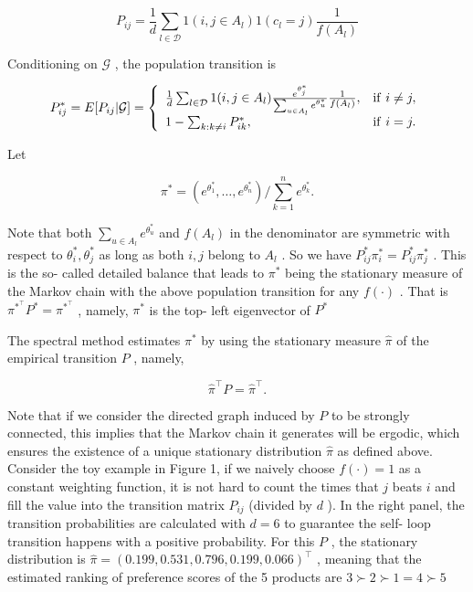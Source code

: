 \[
P_{i j} = \frac{1}{d}\sum_{l\in \mathcal{D}}1(i,j\in A_{l})1(c_{l} = j)\frac{1}{f(A_{l})}
\]

Conditioning on \(\mathcal{G}\) , the population transition is

\[
P_{i j}^{*} = E[P_{i j}|\mathcal{G}] = \left\{ \begin{array}{l l}{\frac{1}{d}\sum_{l\in \mathcal{D}}1(i,j\in A_{l})\frac{e^{\theta_{j}^{*}}}{\sum_{u\in A_{l}}e^{\theta_{u}^{*}}}\frac{1}{f(A_{l})},} & {\mathrm{if~}i\neq j,}\\ {1 - \sum_{k:k\neq i}P_{i k}^{*},} & {\mathrm{if~}i = j.} \end{array} \right.
\]

Let

\[
\pi^{*} = (e^{\theta_{1}^{*}},\ldots ,e^{\theta_{n}^{*}}) / \sum_{k = 1}^{n}e^{\theta_{k}^{*}}.
\]

Note that both \(\sum_{u\in A_{l}}e^{\theta_{u}^{*}}\) and \(f(A_{l})\)
in the denominator are symmetric with respect to
\(\theta_{i}^{*},\theta_{j}^{*}\) as long as both \(i,j\) belong to
\(A_{l}\) . So we have
\(P_{i j}^{*}\pi_{i}^{*} = P_{i j}^{*}\pi_{j}^{*}\) . This is the so-
called detailed balance that leads to \(\pi^{*}\) being the stationary
measure of the Markov chain with the above population transition for any
\(f(\cdot)\) . That is \(\pi^{*}^{\top}P^{*} = \pi^{*}^{\top}\) ,
namely, \(\pi^{*}\) is the top- left eigenvector of \(P^{*}\)

The spectral method estimates \(\pi^{*}\) by using the stationary
measure \(\widehat{\pi}\) of the empirical transition \(P\) , namely,

\[
\widehat{\pi}^{\top}P = \widehat{\pi}^{\top}.
\]

Note that if we consider the directed graph induced by \(P\) to be
strongly connected, this implies that the Markov chain it generates will
be ergodic, which ensures the existence of a unique stationary
distribution \(\widehat{\pi}\) as defined above. Consider the toy
example in Figure 1, if we naively choose \(f(\cdot) = 1\) as a constant
weighting function, it is not hard to count the times that \(j\) beats
\(i\) and fill the value into the transition matrix \(P_{i j}\) (divided
by \(d\) ). In the right panel, the transition probabilities are
calculated with \(d = 6\) to guarantee the self- loop transition happens
with a positive probability. For this \(P\) , the stationary
distribution is
\(\widehat{\pi} = (0.199,0.531,0.796,0.199,0.066)^{\top}\) , meaning
that the estimated ranking of preference scores of the 5 products are
\(3\succ 2\succ 1 = 4\succ 5\)

